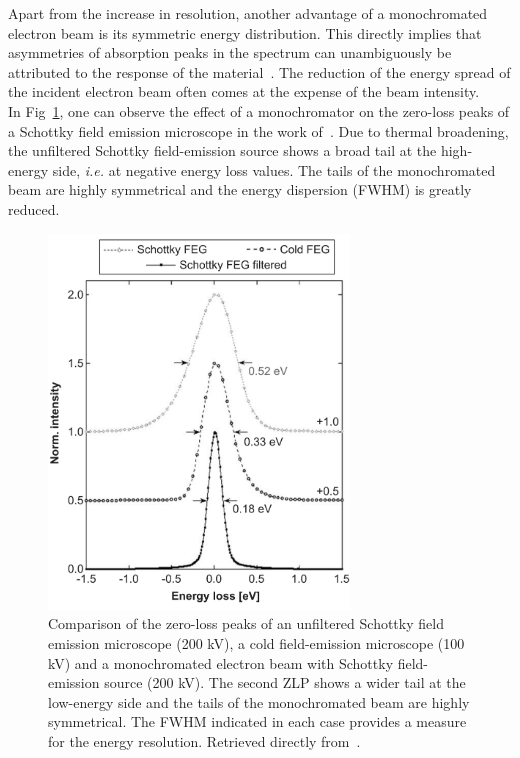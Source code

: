 Apart from the increase in resolution, another advantage of a monochromated 
electron beam is its symmetric energy distribution. 
%
This directly implies that asymmetries of absorption peaks in the spectrum can 
unambiguously be attributed to the response of the material~\cite{Erni:2005}.
%
The reduction of the energy spread of the incident electron beam often 
comes at the expense of the beam intensity. \\

In Fig~\ref{fig:monochromation}, one can observe the effect of a monochromator 
on the zero-loss peaks of a Schottky field emission microscope in the work of~\cite{Erni:2005}. 
%
Due to thermal broadening, the unfiltered Schottky field-emission source
shows a broad tail at the high-energy side, {\it i.e.} at negative energy loss values.
%
The tails of the monochromated beam are highly symmetrical and the energy dispersion (FWHM)
is greatly reduced.

\begin{figure}[H]
    \centering
    \includegraphics[width=80mm]{plots/monochromator.png}
    \caption{Comparison of the zero-loss peaks of an unfiltered Schottky field emission microscope 
    (200 kV), a cold field-emission microscope (100 kV) and a monochromated electron beam with 
    Schottky field-emission source (200 kV). 
    The second ZLP shows a wider tail at the low-energy side and the tails of the 
    monochromated beam are highly symmetrical. 
    The FWHM indicated in each case provides a measure for the energy resolution.
    Retrieved directly from~\cite{Erni:2005}.}
    \label{fig:monochromation}
\end{figure}


